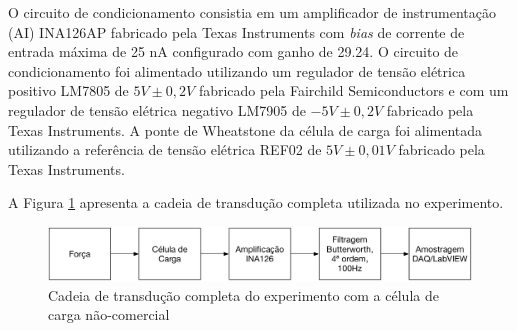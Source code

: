 \documentclass[a4paper]{instrumentacao}
\begin{document}
O circuito de condicionamento consistia em um amplificador de instrumentação (AI) INA126AP fabricado pela Texas Instruments com \textit{bias} de corrente de entrada máxima de 25 nA \cite{datasheet-ina126} configurado com ganho de 29.24. O circuito de condicionamento foi alimentado utilizando um regulador de tensão elétrica positivo LM7805 de $5V \pm 0,2V$ \cite{datasheet-lm7805} fabricado pela Fairchild Semiconductors e com um regulador de tensão elétrica negativo LM7905 de $-5V \pm 0,2V$ \cite{datasheet-lm7905} fabricado pela Texas Instruments. A ponte de Wheatstone da célula de carga foi alimentada utilizando a referência de tensão elétrica REF02 de $5V \pm 0,01V$ \cite{datasheet-ref02} fabricado pela Texas Instruments.

%
%
%

A Figura \ref{fig:celula-nao-comercial-cadeia-transducao} apresenta a cadeia de transdução completa utilizada no experimento.

\begin{figure}[H]
\center
\includegraphics[width=\textwidth]{NaoComercial-Cadeia-Transducao.pdf}
\caption{Cadeia de transdução completa do experimento com a célula de carga não-comercial}
\label{fig:celula-nao-comercial-cadeia-transducao}
\end{figure}
\end{document}
